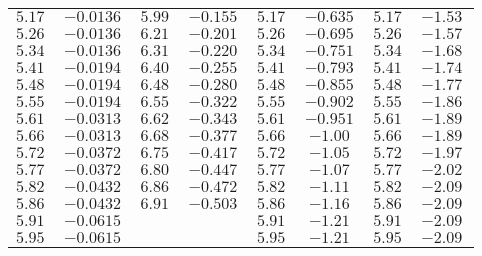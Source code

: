 \documentclass[
  bibliography=totoc,     %
  captions=tableheading,  %
  titlepage=firstiscover, %
]{scrartcl}
\begin{document}
\begin{table}
\begin{tabular}{c c c c c c c c}
    $\SI{ 5.17}{}$  & $\SI{-0.0136}{}$  & $\SI{ 5.99}{}$ & $\SI{-0.155}{}$   & $\SI{ 5.17}{}$  & $\SI{-0.635}{}$ & $\SI{ 5.17}{}$ & $\SI{-1.53}{}$   \\
    $\SI{ 5.26}{}$  & $\SI{-0.0136}{}$  & $\SI{ 6.21}{}$ & $\SI{-0.201}{}$   & $\SI{ 5.26}{}$  & $\SI{-0.695}{}$ & $\SI{ 5.26}{}$ & $\SI{-1.57}{}$   \\
    $\SI{ 5.34}{}$  & $\SI{-0.0136}{}$  & $\SI{ 6.31}{}$ & $\SI{-0.220}{}$   & $\SI{ 5.34}{}$  & $\SI{-0.751}{}$ & $\SI{ 5.34}{}$ & $\SI{-1.68}{}$   \\
    $\SI{ 5.41}{}$  & $\SI{-0.0194}{}$  & $\SI{ 6.40}{}$ & $\SI{-0.255}{}$   & $\SI{ 5.41}{}$  & $\SI{-0.793}{}$ & $\SI{ 5.41}{}$ & $\SI{-1.74}{}$   \\
    $\SI{ 5.48}{}$  & $\SI{-0.0194}{}$  & $\SI{ 6.48}{}$ & $\SI{-0.280}{}$   & $\SI{ 5.48}{}$  & $\SI{-0.855}{}$ & $\SI{ 5.48}{}$ & $\SI{-1.77}{}$   \\
    $\SI{ 5.55}{}$  & $\SI{-0.0194}{}$  & $\SI{ 6.55}{}$ & $\SI{-0.322}{}$   & $\SI{ 5.55}{}$  & $\SI{-0.902}{}$ & $\SI{ 5.55}{}$ & $\SI{-1.86}{}$   \\
    $\SI{ 5.61}{}$  & $\SI{-0.0313}{}$  & $\SI{ 6.62}{}$ & $\SI{-0.343}{}$   & $\SI{ 5.61}{}$  & $\SI{-0.951}{}$ & $\SI{ 5.61}{}$ & $\SI{-1.89}{}$   \\
    $\SI{ 5.66}{}$  & $\SI{-0.0313}{}$  & $\SI{ 6.68}{}$ & $\SI{-0.377}{}$   & $\SI{ 5.66}{}$  & $\SI{-1.00}{}$  & $\SI{ 5.66}{}$ & $\SI{-1.89}{}$   \\
    $\SI{ 5.72}{}$  & $\SI{-0.0372}{}$  & $\SI{ 6.75}{}$ & $\SI{-0.417}{}$   & $\SI{ 5.72}{}$  & $\SI{-1.05}{}$  & $\SI{ 5.72}{}$ & $\SI{-1.97}{}$   \\
    $\SI{ 5.77}{}$  & $\SI{-0.0372}{}$  & $\SI{ 6.80}{}$ & $\SI{-0.447}{}$   & $\SI{ 5.77}{}$  & $\SI{-1.07}{}$  & $\SI{ 5.77}{}$ & $\SI{-2.02}{}$   \\
    $\SI{ 5.82}{}$  & $\SI{-0.0432}{}$  & $\SI{ 6.86}{}$ & $\SI{-0.472}{}$   & $\SI{ 5.82}{}$  & $\SI{-1.11}{}$  & $\SI{ 5.82}{}$ & $\SI{-2.09}{}$   \\
    $\SI{ 5.86}{}$  & $\SI{-0.0432}{}$  & $\SI{ 6.91}{}$ & $\SI{-0.503}{}$   & $\SI{ 5.86}{}$  & $\SI{-1.16}{}$  & $\SI{ 5.86}{}$ & $\SI{-2.09}{}$   \\
    $\SI{ 5.91}{}$  & $\SI{-0.0615}{}$  &                &                   & $\SI{ 5.91}{}$  & $\SI{-1.21}{}$  & $\SI{ 5.91}{}$ & $\SI{-2.09}{}$   \\
    $\SI{ 5.95}{}$  & $\SI{-0.0615}{}$  &                &                   & $\SI{ 5.95}{}$  & $\SI{-1.21}{}$  & $\SI{ 5.95}{}$ & $\SI{-2.09}{}$   \\

\end{tabular}
\end{table}
\end{document}
